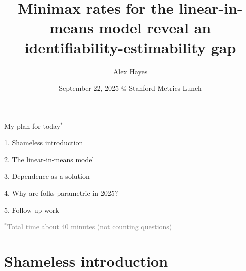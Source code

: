 \documentclass[aspectratio=169]{beamer}
\title{Minimax rates for the linear-in-means model reveal an identifiability-estimability gap}
\author{Alex Hayes}
\date{September 22, 2025 @ Stanford Metrics Lunch}
\institute{Joint work with Keith Levin at UW-Madison}
\theoremstyle{remark}
\begin{document}
\maketitle

\begin{frame}{My plan for today$^*$}
    
    \large
    
    1. Shameless introduction
    
    2. The linear-in-means model
    
    3. Dependence as a solution
    
    4. Why are folks parametric in 2025?
    
    5. Follow-up work
    
    \vspace{4mm}
    \textcolor{gray}{\footnotesize $^*$Total time about 40 minutes (not counting questions)}
    
\end{frame}

\section{Shameless introduction}
\end{document}
